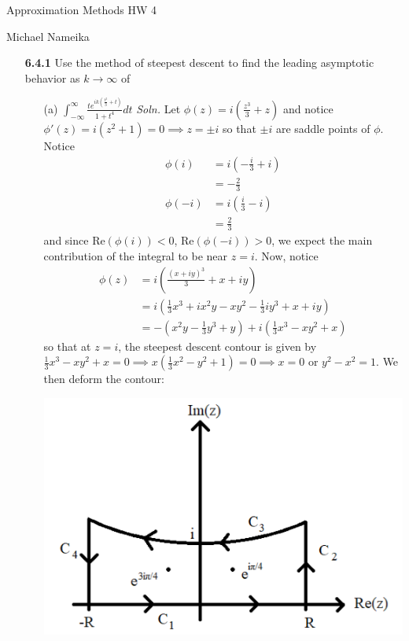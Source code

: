 \documentclass{article}
\begin{document}
\begin{center}
    {\huge Approximation Methods HW 4}
    \vspace{0.5cm}

    {\large Michael Nameika}
\end{center}

\begin{itemize}
    \item[\textbf{6.4.1}] Use the method of steepest descent to find the leading asymptotic behavior as $k \to \infty$ of
    \begin{itemize}
        \item[(a)] ${\displaystyle \int_{-\infty}^{\infty}\frac{te^{ik\left(\frac{t^3}{3}+t\right)}}{1+t^4}dt }$
        \newline\newline
        \textit{Soln.} Let $\phi(z) = i\left(\frac{z^3}{3} + z\right)$ and notice $\phi'(z) = i(z^2 + 1) = 0 \implies z = \pm i$ so that $\pm i$ are saddle points of $\phi$. Notice
        \begin{align*}
            \phi(i) &= i\left(-\frac{i}{3} + i\right)\\
            &= -\frac{2}{3}\\
            \phi(-i) &= i\left(\frac{i}{3} - i\right)\\
            &= \frac{2}{3}
        \end{align*}
        and since $\text{Re}(\phi(i)) < 0$, $\text{Re}(\phi(-i)) > 0$, we expect the main contribution of the integral to be near $z = i$. Now, notice
        \begin{align*}
            \phi(z) &= i\left(\frac{(x + iy)^3}{3} + x + iy\right)\\
            &= i\left(\frac{1}{3}x^3 + ix^2y - xy^2 - \frac{1}{3}iy^3 + x + iy\right)\\
            &= -\left(x^2y - \frac{1}{3}y^3 + y\right) + i\left(\frac{1}{3}x^3 - xy^2 + x\right)
        \end{align*}
        so that at $z = i$, the steepest descent contour is given by $\frac{1}{3}x^3 - xy^2 + x = 0 \implies x\left(\frac{1}{3}x^2 - y^2 + 1\right) = 0 \implies x = 0$ or $y^2 - x^2 = 1$. We then deform the contour:

        \begin{center}
            \includegraphics[scale = 0.4]{prob1acontour.PNG}
        \end{center}


\end{itemize}
\end{itemize}
\end{document}
